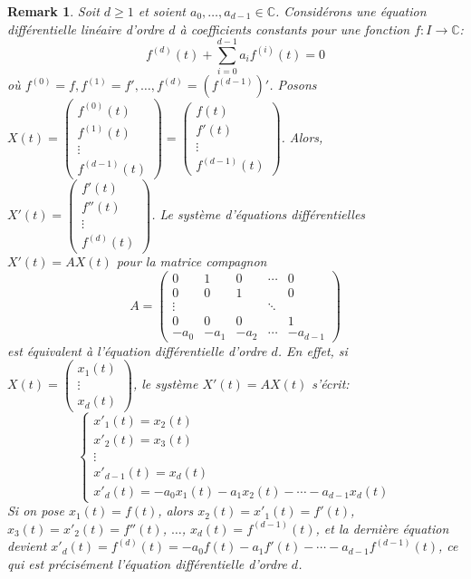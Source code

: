 \documentclass{article}
\newtheorem{remark}{Remark}
\begin{document}
\begin{remark}
Soit $d \ge 1$ et soient $a_0, \ldots, a_{d-1} \in \mathbb{C}$. Considérons une équation différentielle linéaire d'ordre $d$ à coefficients constants pour une fonction $f: I \to \mathbb{C}$:
\[ f^{(d)}(t) + \sum_{i=0}^{d-1} a_i f^{(i)}(t) = 0 \]
où $f^{(0)} = f, f^{(1)} = f', \ldots, f^{(d)} = (f^{(d-1)})'$. Posons $X(t) = \begin{pmatrix} f^{(0)}(t) \\ f^{(1)}(t) \\ \vdots \\ f^{(d-1)}(t) \end{pmatrix} = \begin{pmatrix} f(t) \\ f'(t) \\ \vdots \\ f^{(d-1)}(t) \end{pmatrix}$. Alors, $X'(t) = \begin{pmatrix} f'(t) \\ f''(t) \\ \vdots \\ f^{(d)}(t) \end{pmatrix}$.
Le système d'équations différentielles $X'(t) = A X(t)$ pour la matrice compagnon
\[ A = \begin{pmatrix}
0 & 1 & 0 & \cdots & 0 \\
0 & 0 & 1 & & 0 \\
\vdots & & & \ddots & \\
0 & 0 & 0 & & 1 \\
-a_0 & -a_1 & -a_2 & \cdots & -a_{d-1}
\end{pmatrix} \]
est équivalent à l'équation différentielle d'ordre $d$. En effet, si $X(t) = \begin{pmatrix} x_1(t) \\ \vdots \\ x_d(t) \end{pmatrix}$, le système $X'(t) = A X(t)$ s'écrit:
\begin{equation*}
\begin{cases}
x'_1(t) = x_2(t) \\
x'_2(t) = x_3(t) \\
\vdots \\
x'_{d-1}(t) = x_d(t) \\
x'_d(t) = -a_0 x_1(t) - a_1 x_2(t) - \cdots - a_{d-1} x_d(t)
\end{cases}
\end{equation*}
Si on pose $x_1(t) = f(t)$, alors $x_2(t) = x'_1(t) = f'(t)$, $x_3(t) = x'_2(t) = f''(t)$, $\ldots$, $x_d(t) = f^{(d-1)}(t)$, et la dernière équation devient $x'_d(t) = f^{(d)}(t) = -a_0 f(t) - a_1 f'(t) - \cdots - a_{d-1} f^{(d-1)}(t)$, ce qui est précisément l'équation différentielle d'ordre $d$.
\end{remark}
\end{document}
